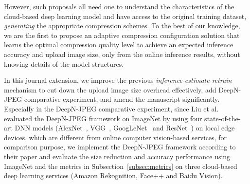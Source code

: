 However, such proposals all need one to understand the characteristics of the cloud-based deep learning model and have access to the original training dataset,  \emph{generating} the appropriate compression schemes. To the best of our knowledge, we are the first to propose an adaptive compression configuration solution that learns the optimal compression quality level to achieve an expected inference accuracy and upload image size, only from the online inference results, without knowing details of the model structures. 

In this journal extension, we improve the previous \emph{inference-estimate-retrain} mechanism to cut down the upload image size overhead effectively, add DeepN-JPEG comparative experiment, and amend the manuscript significantly. Especially in the DeepN-JPEG comparative experiment, since Liu et al.~\cite{DeepN-JPEG} evaluated the DeepN-JPEG framework on ImageNet by using four state-of-the-art DNN models (AlexNet~\cite{AlexNet-krizhevsky2012imagenet}, VGG~\cite{VGG-simonyan2014very}, GoogLeNet~\cite{GoogleNet-szegedy2015going} and ResNet~\cite{ResNet-he2016deep}) on local edge devices, which are different from online computer vision-based services, for comparison purpose, we implement the DeepN-JPEG framework according to their paper and evaluate the size reduction and accuracy performance using ImageNet and the metrics in Subsection~\ref{subsec:metrics} on three cloud-based deep learning services (Amazon Rekognition, Face++ and Baidu Vision).

